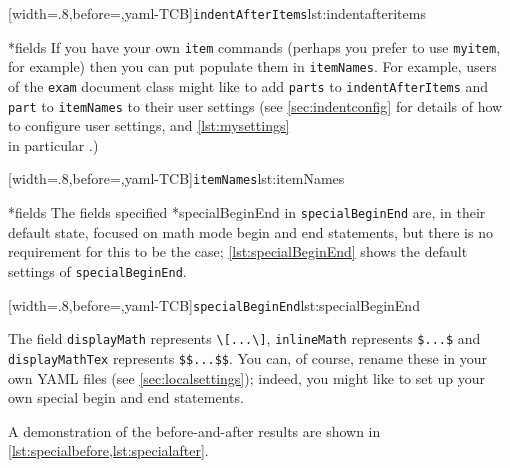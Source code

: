 	\begin{cmhtcbraster}[raster columns=3,
			raster left skip=-3.5cm,
			raster right skip=-2cm,
			raster column skip=.03\linewidth]
		[width=.8\linewidth,before=\centering,yaml-TCB]{\texttt{indentAfterItems}}{lst:indentafteritems}
	\end{cmhtcbraster}

*{fields}
	If you have your own \texttt{item} commands (perhaps you prefer to use \texttt{myitem},
	for example) then you can put populate them in \texttt{itemNames}. For example, users of
	the \texttt{exam} document class might like to add \texttt{parts} to
	\texttt{indentAfterItems} and \texttt{part} to \texttt{itemNames} to their user settings
	(see \vref{sec:indentconfig} for details of how to configure user settings, and
	\vref{lst:mysettings} \\ in particular \label{page:examsettings}.)

	[width=.8\linewidth,before=\centering,yaml-TCB]{\texttt{itemNames}}{lst:itemNames}

*{fields}\label{yaml:specialBeginEnd}
	The fields specified 
	*{specialBeginEnd} in \texttt{specialBeginEnd} are, in their default
	state, focused on math mode begin and end statements, but there is no requirement for
	this to be the case; \cref{lst:specialBeginEnd} shows the default settings of
	\texttt{specialBeginEnd}. %

	[width=.8\linewidth,before=\centering,yaml-TCB]{\texttt{specialBeginEnd}}{lst:specialBeginEnd}

	The field \texttt{displayMath} represents \lstinline!\[...\]!, \texttt{inlineMath}
	represents \lstinline!$...$! and \texttt{displayMathTex} represents \lstinline!$$...$$!.
	You can, of course, rename these in your own YAML files (see \vref{sec:localsettings});
	indeed, you might like to set up your own special begin and end statements.

	A demonstration of the before-and-after results are shown in
	\cref{lst:specialbefore,lst:specialafter}.

